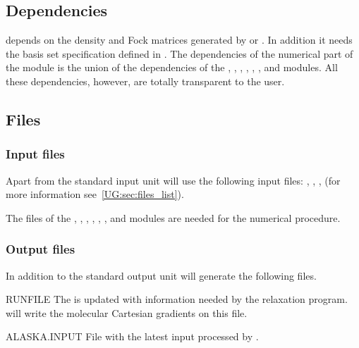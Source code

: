 \subsection{Dependencies}
\label{UG:sec:alaska_dependencies}
 depends on the density and Fock matrices generated by
 or . In addition it needs the basis set
specification defined in .
The dependencies of the numerical part of the module is the union
of the dependencies of the ,
                           ,
                           ,
                           ,
                           ,
                           , and
modules.
All these dependencies, however, are totally transparent to the user.


\subsection{Files}
\label{UG:sec:alaska_files}
\subsubsection{Input files}
Apart from the standard input unit 
will use the following input
files: , , , 
(for more information see~\ref{UG:sec:files_list}).


The files of the ,
                           ,
                           ,
                           ,
                           ,
                           , and
modules are needed for the numerical procedure.



\subsubsection{Output files}
In addition to the standard output unit  will generate the following
files.

\begin{filelist}
\item[RUNFILE]
The  is updated with information needed by the 
relaxation program.
 will write the molecular Cartesian gradients on this file.
\item[ALASKA.INPUT]
File with the latest input processed by .
\end{filelist}

